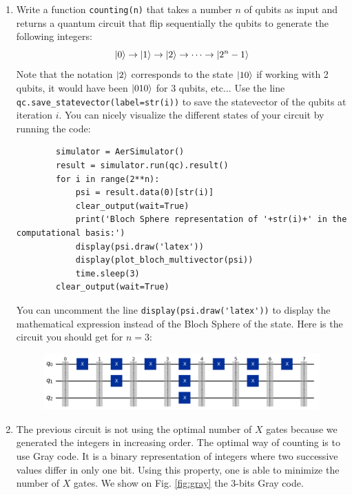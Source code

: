 \documentclass{article}
\begin{document}
\begin{enumerate}
    \item Write a function \verb|counting(n)| that takes a number $n$ of qubits as input and returns a quantum circuit that flip sequentially the qubits to generate the following integers:
    \begin{equation*}
        \ket{0} \rightarrow \ket{1} \rightarrow \ket{2} \rightarrow \dots \rightarrow \ket{2^n-1}
    \end{equation*}
    Note that the notation $\ket{2}$ corresponds to the state $\ket{10}$ if working with 2 qubits, it would have been $\ket{010}$ for 3 qubits, etc... Use the line \verb|qc.save_statevector(label=str(i))| to save the statevector of the qubits at iteration $i$. You can nicely visualize the different states of your circuit by running the code:
    \begin{verbatim}
        simulator = AerSimulator()
        result = simulator.run(qc).result()
        for i in range(2**n):
            psi = result.data(0)[str(i)]
            clear_output(wait=True)
            print('Bloch Sphere representation of '+str(i)+' in the computational basis:')
            display(psi.draw('latex'))
            display(plot_bloch_multivector(psi))
            time.sleep(3)
        clear_output(wait=True)
    \end{verbatim}
    You can uncomment the line \verb|display(psi.draw('latex'))| to display the mathematical expression instead of the Bloch Sphere of the state. Here is the circuit you should get for $n=3$:
    \begin{figure}[H]
        \centering
        \includegraphics[scale=0.2]{counting.png}
    \end{figure}
    \item The previous circuit is not using the optimal number of $X$ gates because we generated the integers in increasing order. The optimal way of counting is to use Gray code. It is a binary representation of integers where two successive values differ in only one bit. Using this property, one is able to minimize the number of $X$ gates. We show on Fig. \ref{fig:gray} the 3-bits Gray code.
    \begin{figure}[H]
    \centering

\end{figure}
\end{enumerate}
\end{document}
